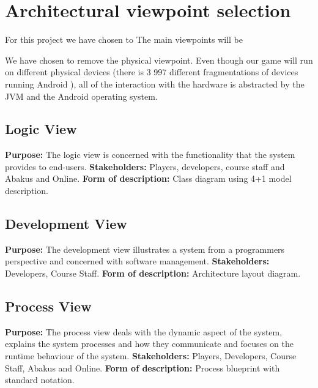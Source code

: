 \section{Architectural viewpoint selection} 
\label{architecturalviewpointselection}

For this project we have chosen to %
The main viewpoints will be %

We have chosen to remove the physical viewpoint. Even though our game will run on different physical devices (there is 3 997 different fragmentations of devices running Android %
), all of the interaction with the hardware is abstracted by the JVM and the Android operating system.

\subsection{Logic View}
{\bf Purpose: } The logic view is concerned with the functionality that the system provides to end-users.
{\bf Stakeholders: } Players, developers, course staff and Abakus and Online.
{\bf Form of description: } Class diagram using 4+1 model description.

\subsection{Development View}
{\bf Purpose: } The development view illustrates a system from a programmers perspective and concerned with software management.
{\bf Stakeholders: } Developers, Course Staff.
{\bf Form of description: } Architecture layout diagram.

\subsection{Process View}
{\bf Purpose: } The process view deals with the dynamic aspect of the system, explains the system processes and how they communicate and focuses on the runtime behaviour of the system.
{\bf Stakeholders: } Players, Developers, Course Staff, Abakus and Online.
{\bf Form of description: } Process blueprint with standard notation.